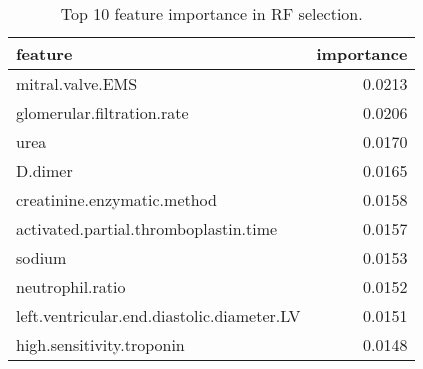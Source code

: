 \begin{table}
\centering
\caption{Top 10 feature importance in RF selection.}
\label{tab:importance-rf}
\begin{tabular}{lr}
\toprule
                                   feature &  importance \\
\midrule
                          mitral.valve.EMS &      0.0213 \\
                glomerular.filtration.rate &      0.0206 \\
                                      urea &      0.0170 \\
                                   D.dimer &      0.0165 \\
               creatinine.enzymatic.method &      0.0158 \\
     activated.partial.thromboplastin.time &      0.0157 \\
                                    sodium &      0.0153 \\
                          neutrophil.ratio &      0.0152 \\
left.ventricular.end.diastolic.diameter.LV &      0.0151 \\
                 high.sensitivity.troponin &      0.0148 \\
\bottomrule
\end{tabular}
\end{table}

